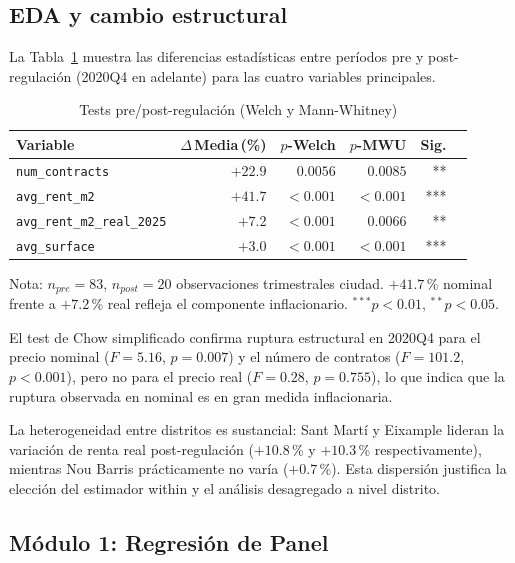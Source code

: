 \documentclass[12pt,a4paper]{article}
\begin{document}
\subsection{EDA y cambio estructural}

La Tabla~\ref{tab:prepost} muestra las diferencias estadísticas entre períodos
pre y post-regulación (2020Q4 en adelante) para las cuatro variables principales.

\begin{table}[H]
\caption{Tests pre/post-regulación (Welch y Mann-Whitney)}
\label{tab:prepost}
\centering
\small
\begin{threeparttable}
\begin{tabular}{lrrrrl}
\toprule
Variable & $\Delta$\,Media\,(\%) & $p$-Welch & $p$-MWU & Sig. \\
\midrule
\texttt{num\_contracts}             & $+22.9$ & $0.0056$ & $0.0085$ & ** \\
\texttt{avg\_rent\_m2}              & $+41.7$ & $<0.001$ & $<0.001$ & *** \\
\texttt{avg\_rent\_m2\_real\_2025}  & $+7.2$  & $<0.001$ & $0.0066$ & ** \\
\texttt{avg\_surface}               & $+3.0$  & $<0.001$ & $<0.001$ & *** \\
\bottomrule
\end{tabular}
\begin{tablenotes}
\small\item Nota: $n_{pre}=83$, $n_{post}=20$ observaciones trimestrales ciudad.
$+41.7$\,\% nominal frente a $+7.2$\,\% real refleja el componente inflacionario.
$^{***}p<0.01$, $^{**}p<0.05$.
\end{tablenotes}
\end{threeparttable}
\end{table}

El test de Chow simplificado confirma ruptura estructural en 2020Q4 para el precio
nominal ($F = 5.16$, $p = 0.007$) y el número de contratos ($F = 101.2$, $p < 0.001$),
pero no para el precio real ($F = 0.28$, $p = 0.755$), lo que indica que la ruptura
observada en nominal es en gran medida inflacionaria.

La heterogeneidad entre distritos es sustancial: Sant Martí y Eixample lideran la
variación de renta real post-regulación ($+10.8$\,\% y $+10.3$\,\% respectivamente),
mientras Nou Barris prácticamente no varía ($+0.7$\,\%). Esta dispersión justifica
la elección del estimador within y el análisis desagregado a nivel distrito.

\subsection{Módulo 1: Regresión de Panel}
\end{document}
